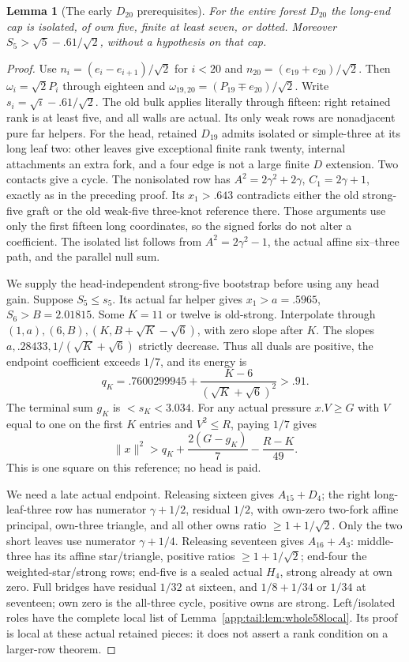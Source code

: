 \documentclass[11pt]{article}
\newtheorem{lemma}[theorem]{Lemma}
\theoremstyle{definition}
\theoremstyle{remark}
\newcommand{\norm}[1]{\lVert #1\rVert}
\begin{document}
\begin{lemma}[The early $D_{20}$ prerequisites]
\label{app:tail:lem:D20early}
For the entire forest $D_{20}$ the long-end cap is isolated, of
own five, finite at least seven, or dotted. Moreover
$S_5>\sqrt5-.61/\sqrt2$, without a hypothesis on that cap.
\end{lemma}
\begin{proof}
Use $n_i=(e_i-e_{i+1})/\sqrt2$ for $i<20$ and
$n_{20}=(e_{19}+e_{20})/\sqrt2$. Then
$\omega_i=\sqrt2P_i$ through eighteen and
$\omega_{19,20}=(P_{19}\mp e_{20})/\sqrt2$.
Write $s_i=\sqrt i-.61/\sqrt2$.
The old bulk applies literally through fifteen: right retained
rank is at least five, and all walls are actual. Its only weak
rows are nonadjacent pure far helpers.
For the head, retained $D_{19}$ admits isolated or simple-three
at its long leaf two: other leaves give exceptional finite rank
twenty, internal attachments an extra fork, and a four edge is
not a large finite $D$ extension. Two contacts give a cycle.
The nonisolated row has $A^2=2\gamma^2+2\gamma$,
$C_1=2\gamma+1$, exactly as in the preceding proof.
Its $x_1>.643$ contradicts either the old strong-five graft
or the old weak-five three-knot reference there. Those arguments
use only the first fifteen long coordinates, so the signed
forks do not alter a coefficient. The isolated list follows
from $A^2=2\gamma^2-1$, the actual affine six--three path,
and the parallel null sum.

We supply the head-independent strong-five bootstrap before using
any head gain. Suppose $S_5\le s_5$. Its actual far helper gives
$x_1>a=.5965$, $S_6>B=2.01815$.
Some $K=11$ or twelve is old-strong. Interpolate through
$(1,a),(6,B),(K,B+\sqrt K-\sqrt6)$, with zero slope after $K$.
The slopes $a,.28433,1/(\sqrt K+\sqrt6)$ strictly decrease.
Thus all duals are positive, the endpoint coefficient exceeds
$1/7$, and its energy is
\[
 q_K=.7600299945+{\frac{K-6}{(\sqrt K+\sqrt6)^2}}>.91.
\]
The terminal sum $g_K$ is $<s_K<3.034$.
For any actual pressure $x.V\ge G$ with $V$ equal to one on
the first $K$ entries and $V^2\le R$, paying $1/7$ gives
\begin{equation}\label{app:tail:eq:D20weak5pay}
 \norm x^2>q_K+{\frac{2(G-g_K)}{7}}-{\frac{R-K}{49}}.
\end{equation}
This is one square on this reference; no head is paid.

We need a late actual endpoint. Releasing sixteen gives
$A_{15}+D_4$; the right long-leaf-three row has numerator
$\gamma+1/2$, residual $1/2$, with own-zero two-fork affine
principal, own-three triangle, and all other owns ratio
$\ge1+1/\sqrt2$. Only the two short leaves use numerator
$\gamma+1/4$. Releasing seventeen gives $A_{16}+A_3$:
middle-three has its affine star/triangle, positive ratios
$\ge1+1/\sqrt2$; end-four the weighted-star/strong rows;
end-five is a sealed actual $H_4$, strong already at own zero.
Full bridges have residual $1/32$ at sixteen, and
$1/8+1/34$ or $1/34$ at seventeen; own zero is the all-three
cycle, positive owns are strong. Left/isolated roles have the
complete local list of Lemma~\ref{app:tail:lem:whole58local}.
Its proof is local at these actual retained pieces: it does not
assert a rank condition on a larger-row theorem.


\end{proof}
\end{document}
